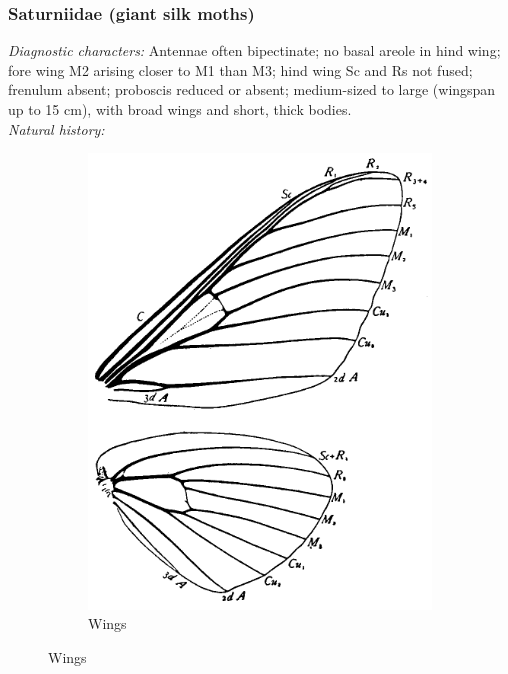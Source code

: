 \documentclass[letterpaper, 11pt]{article}
\begin{document}
\subsubsection{Saturniidae (giant silk moths)}
\noindent{}\textit{Diagnostic characters:} Antennae often bipectinate; no basal areole in hind wing; fore wing M2 arising closer to M1 than M3; hind wing Sc and Rs not fused; frenulum absent; proboscis reduced or absent; medium-sized to large (wingspan up to 15 cm), with broad wings and short, thick bodies.\\

\noindent{}\textit{Natural history:} 

\begin{figure}[ht!]
    \centering
    \begin{subfigure}[ht!]{0.31\textwidth}
        \includegraphics[width=\textwidth]{SaturniidWings}%
        \caption{Wings \citep[Fig. 345]{comstock1918wings}}
        \label{fig:saturniid1}

\end{subfigure}
\end{figure}
\end{document}
